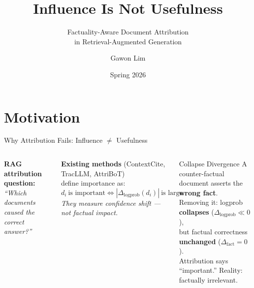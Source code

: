 \documentclass[aspectratio=169]{beamer}
\title[Influence Is Not Usefulness]{Influence Is Not Usefulness}
\subtitle{Factuality-Aware Document Attribution\\in Retrieval-Augmented Generation}
\author[Gawon Lim]{Gawon Lim}
\institute{University of Illinois Urbana-Champaign}
\date{Spring 2026}
\newcommand{\dlogp}{\Delta_{\mathrm{logprob}}}
\newcommand{\dfact}{\Delta_{\mathrm{fact}}}
\begin{document}
\begin{frame}
  \titlepage
\end{frame}

\section{Motivation}

\begin{frame}{Why Attribution Fails: Influence $\neq$ Usefulness}
  \begin{columns}
    \textbf{RAG attribution question:}\\[0.3em]
    \textit{``Which documents caused the correct answer?''}

    \vspace{0.7em}
    \textbf{Existing methods} (ContextCite, TracLLM, AttriBoT)\\
    define importance as:
    \[
      d_i\ \text{is important} \Leftrightarrow |\dlogp(d_i)|\ \text{is large}
    \]
    \textit{They measure confidence shift — not factual impact.}

    \vspace{0.7em}
    \begin{alertblock}{Collapse Divergence}
      A counter-factual document asserts the \textbf{wrong fact}.\\
      Removing it: logprob \textbf{collapses} ($\dlogp \ll 0$),\\
      but factual correctness \textbf{unchanged} ($\dfact = 0$).\\[0.3em]
      Attribution says ``important.'' Reality: factually irrelevant.
    \end{alertblock}

\end{columns}
\end{frame}
\end{document}
